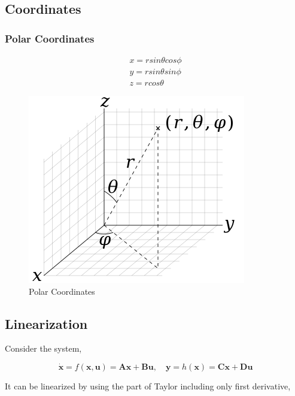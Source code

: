 \subsection{Coordinates}

\subsubsection{Polar Coordinates}

\begin{equation}
\begin{aligned}
    x = r sin\theta cos \phi \\
    y = r sin\theta sin \phi \\
    z = r cos\theta
\end{aligned}
\end{equation}

\begin{figure}[H]
    \centering
    \includegraphics[scale=0.7]{figures/3D_Spherical.svg.png}
    \caption{Polar Coordinates}
    \label{fig:polar}
\end{figure}

\subsection{Linearization}

Consider the system,

\begin{equation}
    \Dot{\mathbf{x}} =  f(\mathbf{x,u}) = \mathbf{Ax + Bu}, \quad \mathbf{y} = h(\mathbf{x}) = \mathbf{Cx + Du}
\end{equation}

It can be linearized by using the part of Taylor including only first derivative,

